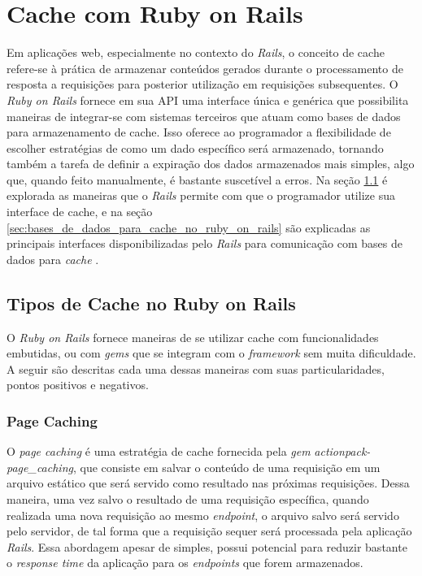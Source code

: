\section{Cache com Ruby on Rails}

Em aplicações web, especialmente no contexto do \textit{Rails}, o conceito de cache refere-se à prática de armazenar conteúdos gerados durante o processamento de resposta a requisições para posterior utilização em requisições subsequentes. O \textit{Ruby on Rails} fornece em sua API uma interface única e genérica que possibilita maneiras de integrar-se com sistemas terceiros que atuam como bases de dados para armazenamento de cache. Isso oferece ao programador a flexibilidade de escolher estratégias de como um dado específico será armazenado, tornando também a tarefa de definir a expiração dos dados armazenados mais simples, algo que, quando feito manualmente, é bastante suscetível a erros. Na seção \ref{sec:tipos_de_cache_no_ruby_on_rails} é explorada as maneiras que o \textit{Rails} permite com que o programador utilize sua interface de cache, e na seção \ref{sec:bases_de_dados_para_cache_no_ruby_on_rails} são explicadas as principais interfaces disponibilizadas pelo \textit{Rails} para comunicação com bases de dados para \textit{cache} \cite{caching-with-rails-overview}.

\subsection{Tipos de Cache no Ruby on Rails}
\label{sec:tipos_de_cache_no_ruby_on_rails}

O \textit{Ruby on Rails} fornece maneiras de se utilizar cache com funcionalidades embutidas, ou com \textit{gems} que se integram com o \textit{framework} sem muita dificuldade. A seguir são descritas cada uma dessas maneiras com suas particularidades, pontos positivos e negativos.

\subsubsection{Page Caching}

O \textit{page caching} é uma estratégia de cache fornecida pela \textit{gem}  \textit{actionpack-page\_caching}, que consiste em salvar o conteúdo de uma requisição em um arquivo estático que será servido como resultado nas próximas requisições. Dessa maneira, uma vez salvo o resultado de uma requisição específica, quando realizada uma nova requisição ao mesmo \textit{endpoint}, o arquivo salvo será servido pelo servidor, de tal forma que a requisição sequer será processada pela aplicação \textit{Rails}. Essa abordagem apesar de simples, possui potencial para reduzir bastante o \textit{response time} da aplicação para os \textit{endpoints} que forem armazenados.

